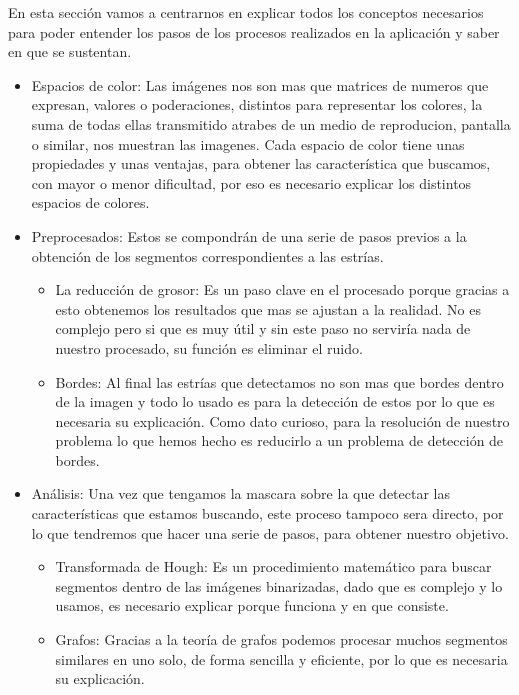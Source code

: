 En esta sección vamos a centrarnos en explicar todos los conceptos necesarios para poder entender los pasos de los procesos realizados en la aplicación y saber en que se sustentan.

\begin{itemize}
\item Espacios de color: Las imágenes nos son mas que matrices de numeros que expresan, valores o poderaciones, distintos para representar los colores, la suma de todas ellas transmitido atrabes de un medio de reproducion, pantalla o similar, nos muestran las imagenes.
Cada espacio de color tiene unas propiedades y unas ventajas, para obtener las característica que buscamos, con mayor o menor dificultad, por eso es necesario explicar los distintos espacios de colores.

\item Preprocesados:
Estos se compondrán de una serie de pasos previos a la obtención de los segmentos correspondientes a las estrías.
	\begin{itemize}
		\item La reducción de grosor: Es un paso clave en el procesado porque gracias a esto obtenemos los resultados que mas se ajustan a la realidad.
No es complejo pero si que es muy útil y sin este paso no serviría nada de nuestro procesado, su función es eliminar el ruido.
		\item Bordes: Al final las estrías que detectamos no son mas que bordes dentro de la imagen y todo lo usado es para la detección de estos por lo que es necesaria su explicación. Como dato curioso, para la resolución de nuestro problema lo que hemos hecho es reducirlo a un problema de detección de bordes.
	\end{itemize}

\item Análisis: 
Una vez que tengamos la mascara sobre la que detectar las características que estamos buscando, este proceso tampoco sera directo, por lo que tendremos que hacer una serie de pasos, para obtener nuestro objetivo.
	\begin{itemize}
	\item Transformada de Hough: Es un procedimiento matemático para buscar segmentos dentro de las imágenes binarizadas, dado que es complejo y lo usamos, es necesario explicar porque funciona y en que consiste.

	\item Grafos: Gracias a la teoría de grafos podemos procesar muchos segmentos similares en uno solo, de forma sencilla y eficiente, por lo que es necesaria su explicación.
	\end{itemize}

\end{itemize}




